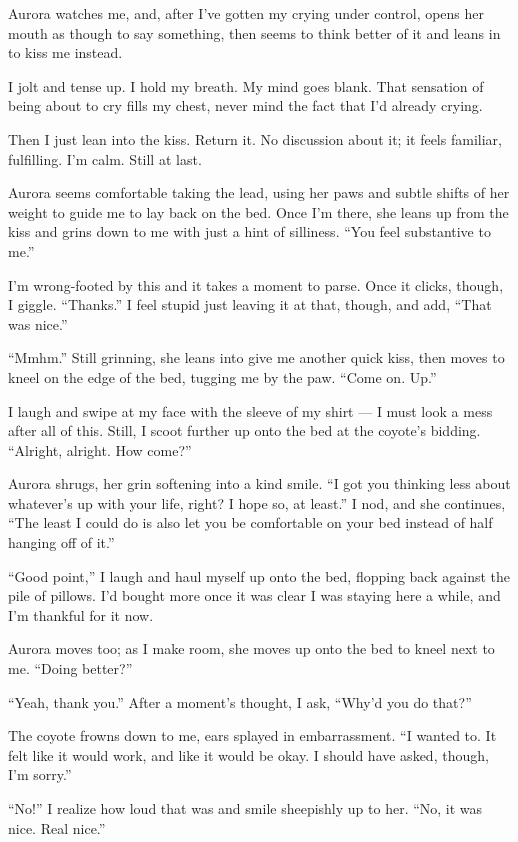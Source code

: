 Aurora watches me, and, after I've gotten my crying under control, opens her mouth as though to say something, then seems to think better of it and leans in to kiss me instead.

I jolt and tense up. I hold my breath. My mind goes blank. That sensation of being about to cry fills my chest, never mind the fact that I'd already crying.

Then I just lean into the kiss. Return it. No discussion about it; it feels familiar, fulfilling. I'm calm. Still at last.

Aurora seems comfortable taking the lead, using her paws and subtle shifts of her weight to guide me to lay back on the bed. Once I'm there, she leans up from the kiss and grins down to me with just a hint of silliness. ``You feel substantive to me.''

I'm wrong-footed by this and it takes a moment to parse. Once it clicks, though, I giggle. ``Thanks.'' I feel stupid just leaving it at that, though, and add, ``That was nice.''

``Mmhm.'' Still grinning, she leans into give me another quick kiss, then moves to kneel on the edge of the bed, tugging me by the paw. ``Come on. Up.''

I laugh and swipe at my face with the sleeve of my shirt --- I must look a mess after all of this. Still, I scoot further up onto the bed at the coyote's bidding. ``Alright, alright. How come?''

Aurora shrugs, her grin softening into a kind smile. ``I got you thinking less about whatever's up with your life, right? I hope so, at least.'' I nod, and she continues, ``The least I could do is also let you be comfortable on your bed instead of half hanging off of it.''

``Good point,'' I laugh and haul myself up onto the bed, flopping back against the pile of pillows. I'd bought more once it was clear I was staying here a while, and I'm thankful for it now.

Aurora moves too; as I make room, she moves up onto the bed to kneel next to me. ``Doing better?''

``Yeah, thank you.'' After a moment's thought, I ask, ``Why'd you do that?''

The coyote frowns down to me, ears splayed in embarrassment. ``I wanted to. It felt like it would work, and like it would be okay. I should have asked, though, I'm sorry.''

``No!'' I realize how loud that was and smile sheepishly up to her. ``No, it was nice. Real nice.''

